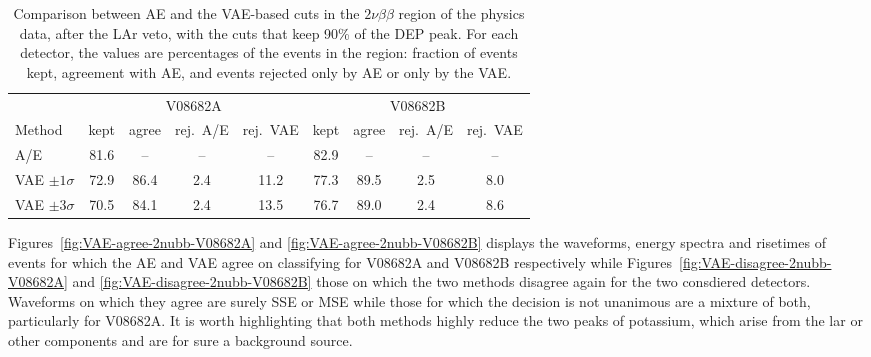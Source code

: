 \begin{table}[H]
    \centering
    \small
    \begin{tabular}{lcccccccc}
        \toprule
         & \multicolumn{4}{c}{V08682A} & \multicolumn{4}{c}{V08682B} \\
        \cmidrule(lr){2-5} \cmidrule(lr){6-9}
        Method & kept & agree & rej.\ A/E & rej.\ VAE & kept & agree & rej.\ A/E & rej.\ VAE \\
        \midrule
        A/E              & 81.6 &   -- & --  & --   & 82.9 & --   & --  & -- \\
        VAE $\pm1\sigma$ & 72.9 & 86.4 & 2.4 & 11.2 & 77.3 & 89.5 & 2.5 & 8.0 \\
        VAE $\pm3\sigma$ & 70.5 & 84.1 & 2.4 & 13.5 & 76.7 & 89.0 & 2.4 & 8.6 \\
        \bottomrule
    \end{tabular}
    \caption{Comparison between \ac{AE} and the \ac{VAE}-based cuts in the $2\nu\beta\beta$ region of the physics data, after the LAr veto, with the cuts that keep 90\% of the \ac{DEP} peak. For each detector, the values are percentages of the events in the region: fraction of events kept, agreement with \ac{AE}, and events rejected only by \ac{AE} or only by the \ac{VAE}.}
    \label{tab:VAE-cuts-2nubb}
\end{table}

Figures~\ref{fig:VAE-agree-2nubb-V08682A} and \ref{fig:VAE-agree-2nubb-V08682B} displays the waveforms, energy spectra and risetimes of events for which the \ac{AE} and \ac{VAE} agree on classifying for V08682A and V08682B respectively while Figures~\ref{fig:VAE-disagree-2nubb-V08682A} and \ref{fig:VAE-disagree-2nubb-V08682B} those on which the two methods disagree again for the two consdiered detectors. Waveforms on which they agree are surely \ac{SSE} or \ac{MSE} while those for which the decision is not unanimous are a mixture of both, particularly for V08682A. It is worth highlighting that both methods highly reduce the two peaks of potassium, which arise from the \ac{lar} or other components and are for sure a background source.


